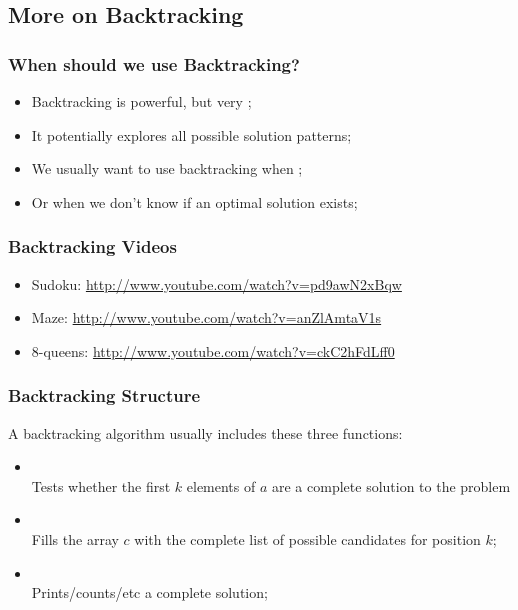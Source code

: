\documentclass{beamer}
\begin{document}
\subsection{More on Backtracking}
\begin{frame}
  \frametitle{When should we use Backtracking?}
  \begin{block}{}
    \begin{itemize}
    \item Backtracking is powerful, but very ;
    \item It potentially explores all possible solution patterns;
    \bigskip

    \item We usually want to use backtracking when ;
    \item Or when we don't know if an optimal solution exists;
    \bigskip
    \end{itemize}
  \end{block}
\end{frame}

\begin{frame}
  \frametitle{Backtracking Videos}
  \begin{itemize}
  \item Sudoku: \url{http://www.youtube.com/watch?v=pd9awN2xBqw}
  \item Maze: \url{http://www.youtube.com/watch?v=anZlAmtaV1s}
  \item 8-queens: \url{http://www.youtube.com/watch?v=ckC2hFdLff0}
  \end{itemize}
\end{frame}

\begin{frame}
  \frametitle{Backtracking Structure}
  
  \begin{block}{}
    A backtracking algorithm usually includes these three functions:
  \end{block}
  
  \begin{itemize}
    \item {}\\ 
      Tests whether the first $k$ elements of $a$ are a complete
      solution to the problem
      \medskip
    \item {}\\
      Fills the array $c$ with the complete list of possible
      candidates for position $k$;
      \medskip
    \item {}\\
      Prints/counts/etc a complete solution;
  \end{itemize}
\end{frame}
\end{document}
